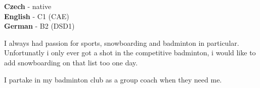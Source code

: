 \documentclass[9pt]{developercv} %
\begin{document}

\begin{minipage}[t]{0.3\textwidth}
	\vspace{-\baselineskip} %

	
	\textbf{Czech} - native\\
	\textbf{English} - C1 (CAE)\\
	\textbf{German} - B2 (DSD1)
\end{minipage}
\hfill
\begin{minipage}[t]{0.3\textwidth}
	\vspace{-\baselineskip} %
	
	
	I always had passion for sports, snowboarding and badminton in particular. Unfortunatly i only ever got a shot in the competitive badminton, i would like to add snowboarding on that list too one day.
\end{minipage}
\hfill
\begin{minipage}[t]{0.3\textwidth}
	\vspace{-\baselineskip} %
	
	
	I partake in my badminton club as a group coach when they need me.
\end{minipage}

\end{document}
